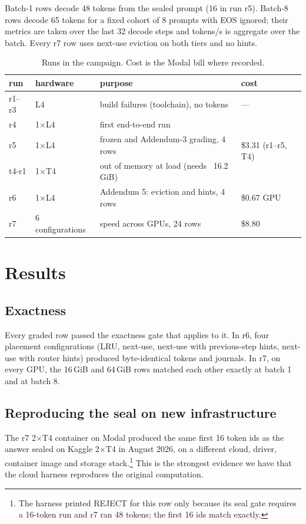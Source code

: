 \documentclass[11pt]{article}
\begin{document}
Batch-1 rows decode 48 tokens from the sealed prompt (16 in run r5). Batch-8
rows decode 65 tokens for a fixed cohort of 8 prompts with EOS ignored; their
metrics are taken over the last 32 decode steps and tokens/s is aggregate over
the batch. Every r7 row uses next-use eviction on both tiers and no hints.

\begin{table}[htbp]
\centering\small
\caption{Runs in the campaign. Cost is the Modal bill where recorded.}
\label{tab:runs}
\begin{tabular}{llll}
\toprule
run & hardware & purpose & cost \\
\midrule
r1--r3 & L4 & build failures (toolchain), no tokens & --- \\
r4 & 1$\times$L4 & first end-to-end run & \multirow{3}{*}{\$3.31 (r1--r5, T4)} \\
r5 & 1$\times$L4 & frozen and Addendum-3 grading, 4 rows & \\
t4-r1 & 1$\times$T4 & out of memory at load (needs ~16.2\,GiB) & \\
r6 & 1$\times$L4 & Addendum 5: eviction and hints, 4 rows & \$0.67 GPU \\
r7 & 6 configurations & speed across GPUs, 24 rows & \$8.80 \\
\bottomrule
\end{tabular}
\end{table}

\section{Results}\label{sec:results}

\subsection{Exactness}

Every graded row passed the exactness gate that applies to it. In r6, four
placement configurations (LRU, next-use, next-use with previous-step hints,
next-use with router hints) produced byte-identical tokens and journals. In r7,
on every GPU, the 16\,GiB and 64\,GiB rows matched each other exactly at batch 1
and at batch 8.

\subsection{Reproducing the seal on new infrastructure}\label{sec:crossgpu}

The r7 2$\times$T4 container on Modal produced the same first 16 token ids as
the answer sealed on Kaggle 2$\times$T4 in August 2026, on a different
cloud, driver, container image and storage stack.\footnote{The harness printed
REJECT for this row only because its seal gate requires a 16-token run and r7
ran 48 tokens; the first 16 ids match exactly.} This is the strongest evidence
we have that the cloud harness reproduces the original computation.
\end{document}
